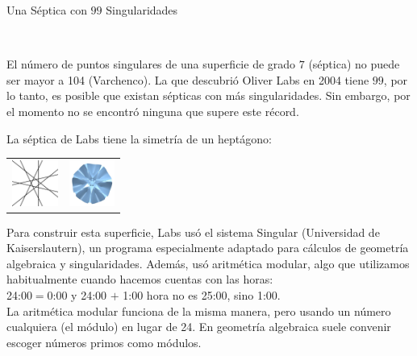 \documentclass[es]{../../common/SurferDesc}%
\begin{document}
\footnotesize
%
\begin{surferPage}
  \begin{surferTitle}Una Séptica con $99$ Singularidades\end{surferTitle} \\
  \begin{surferText}
    El número de puntos singulares de una superficie de grado $7$ (séptica)
    no puede ser mayor a 104 (Varchenco).
    La que descubrió Oliver Labs en 2004 tiene $99$, por lo tanto, es posible 
    que existan sépticas con más singularidades. Sin embargo, por el momento
    no se encontró ninguna que supere este récord.
    
    La séptica de Labs tiene la simetría de un heptágono:  
    
    \vspace*{-0.3em}
    \begin{center}
      \begin{tabular}{c@{\qquad}c}
        \includegraphics[height=1.5cm]{../../common/images/seven_gon}
        &
        \includegraphics[height=1.5cm]{../../common/images/labs_septic_von_oben}
      \end{tabular}
    \end{center}
    \vspace*{-0.3em}
    Para construir esta superficie, Labs usó el sistema 
    {\sc Singular} (Universidad de Kaiserslautern), un programa especialmente adaptado
    para cálculos de geometría algebraica y singularidades. 
    Además, usó aritmética modular, algo que utilizamos habitualmente cuando hacemos cuentas con las horas:\\
    24:00$=$0:00 y 24:00 $+$ 1:00 hora no es 25:00, sino 1:00.\\
    La aritmética modular funciona de la misma manera, pero usando un número cualquiera
    (el módulo) en lugar de 24.
    En geometría algebraica suele convenir escoger números primos como módulos.
 
  \end{surferText}
\end{surferPage}

\end{document}
